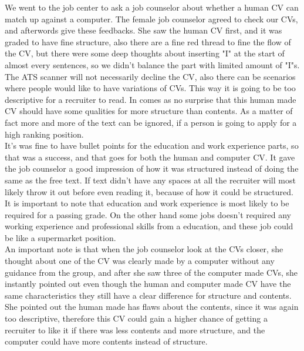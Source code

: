 We went to the job center to ask a job counselor about whether a human CV can match up against a computer.
The female job counselor agreed to check our CVs, and afterwords give these feedbacks. 
She saw the human CV first, and it was graded to have fine structure,
also there are a fine red thread to fine the flow of the CV, 
but there were some deep thoughts about inserting "I" at the start of almost every sentences, 
so we didn't balance the part with limited amount of "I"s.
The ATS scanner will not necessarily decline the CV, also there can be scenarios where people would like to have variations of CVs.
This way it is going to be too descriptive for a recruiter to read. 
In comes as no surprise that this human made CV should have some qualities for more structure than contents.
As a matter of fact more and more of the text can be ignored, if a person is going to apply for a high ranking position. \\

It's was fine to have bullet points for the education and work experience parts, so that was a success, 
and that goes for both the human and computer CV.
It gave the job counselor a good impression of how it was structured instead of doing the same as the free text.
If text didn't have any spaces at all the recruiter will most likely throw it out before even reading it, 
because of how it could be structured. It is important to note that education and work experience is most likely to be required for a passing grade. 
On the other hand some jobs doesn't required any working experience and professional skills from a education, 
and these job could be like a supermarket position. \\

An important note is that when the job counselor look at the CVs closer, 
she thought about one of the CV was clearly made by a computer without any guidance from the group,
and after she saw three of the computer made CVs, she instantly pointed out even though the human and computer made CV have the same characteristics
they still have a clear difference for structure and contents. 
She pointed out the human made has flaws about the contents, since it was again too descriptive, 
therefore this CV could gain a higher chance of getting a recruiter to like it
if there was less contents and more structure, and the computer could have more contents instead of structure.

